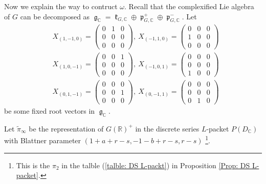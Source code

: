 \documentclass[11pt, a4paper]{amsart}
\theoremstyle{plain}
\theoremstyle{definition}
\numberwithin{equation}{section}
\def\CC{\mathbb{C}}
\def\RR{\mathbb{R}}
\DeclareMathOperator{\lieg}{\mathfrak g}
\DeclareMathOperator{\liek}{\mathfrak k}
\DeclareMathOperator{\liep}{\mathfrak p}
\begin{document}
\par Now we explain the way to contruct $\omega$. Recall that the complexified Lie algebra of $G$ can be decomposed as $\lieg_{\CC} = \liek_{G, \CC} \oplus \liep^{+}_{G, \CC} \oplus \liep^{-}_{G, \CC}$. 
Let
\begin{align*}
    & X_{(1, -1, 0)} = \begin{pmatrix} 
                            0 & 1 & 0 \\
                            0 & 0 & 0 \\
                            0 & 0 & 0 
                       \end{pmatrix}, \ X_{(-1, 1, 0)} = \begin{pmatrix} 
                                                            0 & 0 & 0 \\
                                                            1 & 0 & 0 \\
                                                            0 & 0 & 0 
                                                         \end{pmatrix} \\
    & X_{(1, 0, -1)} = \begin{pmatrix} 
                            0 & 0 & 1 \\
                            0 & 0 & 0 \\
                            0 & 0 & 0 
                       \end{pmatrix}, \   X_{(-1, 0, 1)} = \begin{pmatrix} 
                                                            0 & 0 & 0 \\
                                                            0 & 0 & 0 \\
                                                            1 & 0 & 0 
                                                         \end{pmatrix} \\
     & X_{(0, 1, -1)} = \begin{pmatrix} 
                            0 & 0 & 0 \\
                            0 & 0 & 1 \\
                            0 & 0 & 0 
                       \end{pmatrix}, \ X_{(0, -1, 1)} = \begin{pmatrix} 
                                                            0 & 0 & 0 \\
                                                            0 & 0 & 0 \\
                                                            0 & 1 & 0 
                                                         \end{pmatrix} 
\end{align*}
be some fixed root vectors in $\lieg_{\CC}$. 
\par Let $\tilde{\pi}_{\infty}$ be the representation of $G(\RR)^{+}$ in the discrete series $L$-packet $P(D_{\CC})$ with Blattner parameter $(1 + a + r -s, -1 -b + r - s, r - s)$ \footnote{This is the $\pi_2$ in the talble (\ref{talble: DS L-packt}) in Proposition \ref{Prop: DS L-packet}.}. 
\end{document}
